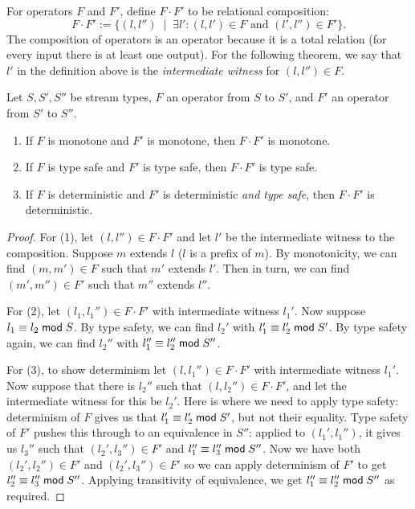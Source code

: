 For operators $F$ and $F'$, define $F \cdot F'$ to be relational composition:
\[
F \cdot F' := \big\{ (l, l'') \;\mid\; \exists l': (l, l') \in F \text{ and } (l', l'') \in F' \big\}.
\]
The composition of operators is an operator because it is a total relation (for every input there is at least one output).
For the following theorem, we say that $l'$ in the definition above is the \emph{intermediate witness} for $(l, l'') \in F$.

\begin{proposition}
\label{prop:compositionality-laws}
Let $S, S', S''$ be stream types, $F$ an operator from $S$ to $S'$, and $F'$ an operator from $S'$ to $S''$.
\begin{enumerate}
  \item If $F$ is monotone and $F'$ is monotone, then $F \cdot F'$ is monotone.
  \item If $F$ is type safe and $F'$ is type safe, then $F \cdot F'$ is type safe.
  \item If $F$ is deterministic and $F'$ is deterministic \emph{and type safe}, then $F \cdot F'$ is deterministic.
\end{enumerate}
\end{proposition}
\begin{proof}
For (1), let $(l, l'') \in F \cdot F'$ and let $l'$ be the intermediate witness to the composition. Suppose $m$ extends $l$ ($l$ is a prefix of $m$). By monotonicity, we can find $(m, m') \in F$ such that $m'$ extends $l'$. Then in turn, we can find $(m', m'') \in F'$ such that $m''$ extends $l''$.

For (2), let $(l_1, l_1'') \in F \cdot F'$ with intermediate witness $l_1'$.
Now suppose $l_1 \equiv l_2 \;\mathsf{mod}\; {S}$.
By type safety, we can find $l_2'$ with $l_1' \equiv l_2' \;\mathsf{mod}\; {S'}$.
By type safety again, we can find $l_2''$ with $l_1'' \equiv l_2'' \;\mathsf{mod}\; {S''}$.

For (3), to show determinism let $(l, l_1'') \in F \cdot F'$ with intermediate witness $l_1'$.
Now suppose that there is $l_2''$ such that
$(l, l_2'') \in F \cdot F'$, and let the intermediate witness for this be $l_2'$. Here is where we need to apply type safety: determinism of $F$ gives us that $l_1' \equiv l_2' \;\mathsf{mod}\; {S'}$, but not their equality.
Type safety of $F'$ pushes this through to an equivalence in $S''$:
applied to $(l_1', l_1'')$, it gives us $l_3''$ such that $(l_2', l_3'') \in F'$ and $l_1'' \equiv l_3'' \;\mathsf{mod}\; {S''}$.
Now we have both $(l_2', l_2'') \in F'$ and $(l_2', l_3'') \in F'$ so we can apply determinism of $F'$ to get $l_2'' \equiv l_3'' \;\mathsf{mod}\; {S''}$.
Applying transitivity of equivalence, we get
$l_1'' \equiv l_2'' \;\mathsf{mod}\; {S''}$ as required.
\end{proof}

